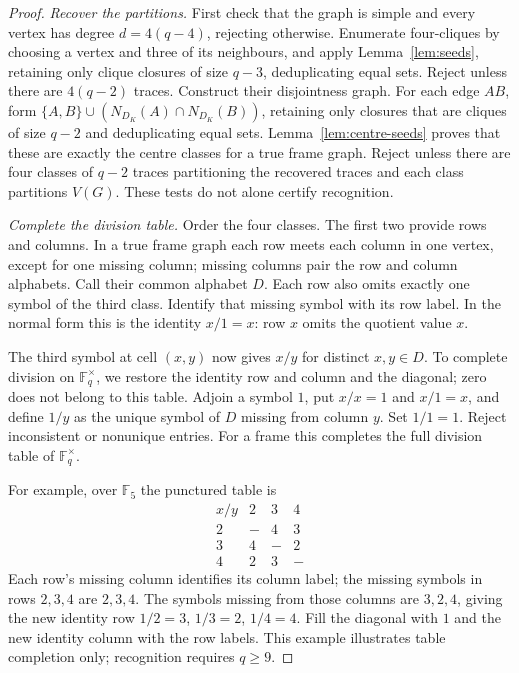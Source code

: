 \documentclass[11pt]{article}
\theoremstyle{definition}
\theoremstyle{remark}
\newcommand{\F}{\mathbb F}
\begin{document}
\begin{proof}
\emph{Recover the partitions.}
First check that the graph is simple and every vertex has degree
$d=4(q-4)$, rejecting otherwise. Enumerate four-cliques by choosing
a vertex and three of its neighbours, and apply Lemma~\ref{lem:seeds}, retaining only
clique closures of size $q-3$, deduplicating equal sets. Reject unless
there are $4(q-2)$ traces.
Construct their disjointness graph. For each edge $AB$, form
$\{A,B\}\cup(N_{D_K}(A)\cap N_{D_K}(B))$, retaining only closures
that are cliques of size $q-2$ and deduplicating equal sets.
Lemma~\ref{lem:centre-seeds} proves that these are exactly the centre
classes for a true frame graph. Reject unless there are four
classes of $q-2$ traces partitioning the recovered traces and each class
partitions $V(G)$. These tests do not alone certify recognition.

\emph{Complete the division table.}
Order the four classes. The first two provide rows and columns. In a
true frame graph each row meets each column in one vertex, except for
one missing column; missing columns pair the row and column alphabets.
Call their common alphabet $D$. Each row also omits exactly one symbol
of the third class. Identify that missing symbol with its row label.
In the normal form this is the identity $x/1=x$: row $x$ omits the
quotient value $x$.

The third symbol at cell $(x,y)$ now gives $x/y$ for distinct $x,y\in D$.
To complete division on $\F_q^\times$, we restore the identity row and column
and the diagonal; zero does not belong to this table.
Adjoin a symbol $1$, put $x/x=1$ and $x/1=x$, and define $1/y$ as the
unique symbol of $D$ missing from column $y$. Set $1/1=1$. Reject
inconsistent or nonunique entries. For a frame this completes the full
division table of $\F_q^\times$.

For example, over $\F_5$ the punctured table is
\[
\begin{array}{c|ccc}
 x/y&2&3&4\\\hline
 2&-&4&3\\
 3&4&-&2\\
 4&2&3&-
\end{array}
\]
Each row's missing column identifies its column label; the missing symbols
in rows $2,3,4$ are $2,3,4$. The symbols missing from those columns are
$3,2,4$, giving the new identity row $1/2=3$, $1/3=2$, $1/4=4$.
Fill the diagonal with $1$ and the new identity column with the row labels.
This example illustrates table completion only; recognition requires $q\ge9$.


\end{proof}
\end{document}
